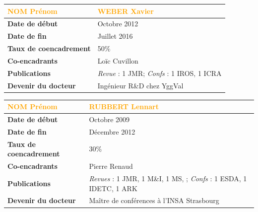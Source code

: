 \documentclass[a4paper,12pt]{article}
\newcommand{\separation}{\noindent{\color{black!40}\rule{\textwidth}{1pt}}}
\begin{document}
\newrefsection
\nocite{2-BCLG19, 4-LCGG18}
\printbibliography[title={\small Publications du doctorant}]

\separation{}

\newpage
%
%
\begin{table}[htbp]
\label{tab:Xavier}
\centering
\begin{tabular}{>{\bfseries}ll}
\toprule %
\textup{\textcolor{orange}{NOM Prénom}} & \large{\textcolor{orange}{WEBER Xavier}}\\
\midrule
Date de début               & Octobre 2012\\
Date de fin                 & Juillet 2016\\
Taux de coencadrement       & 50\%\\
Co-encadrants               & Loïc Cuvillon\\
Publications                & \emph{Revue} : 1 JMR; \emph{Confs} : 1 IROS, 1 ICRA \\
Devenir du docteur          & Ingénieur R\&D chez YggVal \\
\bottomrule
\end{tabular}
\end{table}

\newrefsection
\nocite{2-CWG20,4-WCG15,4-WCG14}
\printbibliography[title={\small Publications du doctorant}]

\separation{}

\newpage
%
%
\begin{table}[htbp]
\label{tab:Lennart}
\centering
\begin{tabular}{>{\bfseries}ll}
\toprule %
\textup{\textcolor{orange}{NOM Prénom}} & \large{\textcolor{orange}{RUBBERT Lennart}}\\
\midrule
Date de début               & Octobre 2009\\
Date de fin                 & Décembre 2012\\
Taux de coencadrement       & 30\%\\
Co-encadrants               & Pierre Renaud\\
Publications                & \emph{Revues} : 1 JMR, 1 M\&I, 1 MS, ; \emph{Confs} : 1 ESDA, 1 IDETC, 1 ARK \\
Devenir du docteur          & Maître de conférences à l'INSA Strasbourg \\
\bottomrule
\end{tabular}
\end{table}
\end{document}
